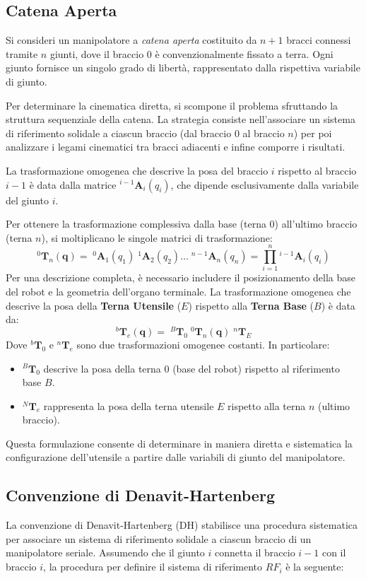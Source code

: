 ﻿\documentclass[11pt, a4paper]{article}
\begin{document}
\newpage
\subsection{Catena Aperta}
Si consideri un manipolatore a \textit{catena aperta} costituito da $n+1$ bracci connessi tramite $n$ giunti, dove il braccio $0$ è convenzionalmente fissato a terra. Ogni giunto fornisce un singolo grado di libertà, rappresentato dalla rispettiva variabile di giunto.

Per determinare la cinematica diretta, si scompone il problema sfruttando la struttura sequenziale della catena. La strategia consiste nell'associare un sistema di riferimento solidale a ciascun braccio (dal braccio $0$ al braccio $n$) per poi analizzare i legami cinematici tra bracci adiacenti e infine comporre i risultati.

La trasformazione omogenea che descrive la posa del braccio $i$ rispetto al braccio $i-1$ è data dalla matrice $^{i-1}\mathbf{A}_{i}(q_{i})$, che dipende esclusivamente dalla variabile del giunto $i$.

Per ottenere la trasformazione complessiva dalla base (terna $0$) all'ultimo braccio (terna $n$), si moltiplicano le singole matrici di trasformazione:
\[
    ^{0}\mathbf{T}_{n}(\mathbf{q}) = \; ^{0}\mathbf{A}_{1}(q_{1}) \; ^{1}\mathbf{A}_{2}(q_{2}) \dots \; ^{n-1}\mathbf{A}_{n}(q_{n}) = \prod_{i=1}^{n} {}^{i-1}\mathbf{A}_{i}(q_{i})
\]
Per una descrizione completa, è necessario includere il posizionamento della base del robot e la geometria dell'organo terminale. La trasformazione omogenea che descrive la posa della \textbf{Terna Utensile} ($E$) rispetto alla \textbf{Terna Base} ($B$) è data da:
\[
    ^{b}\mathbf{T}_{e}(\mathbf{q}) = \; ^{B}\mathbf{T}_{0} \; ^{0}\mathbf{T}_{n}(\mathbf{q}) \; ^{n}\mathbf{T}_{E}
\]
Dove $^{b}\mathbf{T}_{0}$ e $^{n}\mathbf{T}_{e}$ sono due trasformazioni omogenee costanti. In particolare:
\begin{itemize}
    \item $^{B}\mathbf{T}_{0}$ descrive la posa della terna $0$ (base del robot) rispetto al riferimento base $B$.
    \item $^{N}\mathbf{T}_{e}$ rappresenta la posa della terna utensile $E$ rispetto alla terna $n$ (ultimo braccio).
\end{itemize}
Questa formulazione consente di determinare in maniera diretta e sistematica la configurazione dell'utensile a partire dalle variabili di giunto del manipolatore.
\newpage

\subsection{Convenzione di Denavit-Hartenberg}
La convenzione di Denavit-Hartenberg (DH) stabilisce una procedura sistematica per associare un sistema di riferimento solidale a ciascun braccio di un manipolatore seriale. Assumendo che il giunto \(i\) connetta il braccio \(i-1\) con il braccio \(i\), la procedura per definire il sistema di riferimento \(RF_{i}\) è la seguente:
\end{document}
